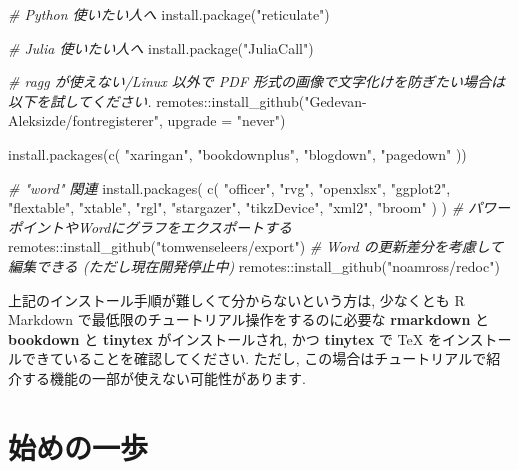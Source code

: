 \documentclass[
]{ltjsarticle}
\newenvironment{Shaded}{\begin{snugshade}}{\end{snugshade}}
\newcommand{\AttributeTok}[1]{\textcolor[rgb]{0.77,0.63,0.00}{#1}}
\newcommand{\CommentTok}[1]{\textcolor[rgb]{0.56,0.35,0.01}{\textit{#1}}}
\newcommand{\FunctionTok}[1]{\textcolor[rgb]{0.00,0.00,0.00}{#1}}
\newcommand{\NormalTok}[1]{#1}
\newcommand{\SpecialCharTok}[1]{\textcolor[rgb]{0.00,0.00,0.00}{#1}}
\newcommand{\StringTok}[1]{\textcolor[rgb]{0.31,0.60,0.02}{#1}}
\newenvironment{infobox}[1]{\begin{itemize}\renewcommand{\labelitemi}{\raisebox{-.7\height}[0pt][0pt]{%
  {\setkeys{Gin}{width=3em,keepaspectratio}\texttt{[image: \_latex/\_img/\#1]}}}}
  \setlength{\fboxsep}{1em}
  \begin{greyblock}
  \item
  }{\end{greyblock}\end{itemize}
}
\begin{document}
\begin{Shaded}
\begin{Highlighting}[numbers=left,,]
\CommentTok{\# Python 使いたい人へ}
\FunctionTok{install.package}\NormalTok{(}\StringTok{"reticulate"}\NormalTok{)}

\CommentTok{\# Julia 使いたい人へ}
\FunctionTok{install.package}\NormalTok{(}\StringTok{"JuliaCall"}\NormalTok{)}

\CommentTok{\# ragg が使えない/Linux 以外で PDF 形式の画像で文字化けを防ぎたい場合は以下を試してください.}
\NormalTok{remotes}\SpecialCharTok{::}\FunctionTok{install\_github}\NormalTok{(}\StringTok{"Gedevan{-}Aleksizde/fontregisterer"}\NormalTok{, }\AttributeTok{upgrade =} \StringTok{"never"}\NormalTok{)}

\FunctionTok{install.packages}\NormalTok{(}\FunctionTok{c}\NormalTok{(}
  \StringTok{"xaringan"}\NormalTok{,}
  \StringTok{"bookdownplus"}\NormalTok{,}
  \StringTok{"blogdown"}\NormalTok{,}
  \StringTok{"pagedown"}
\NormalTok{))}

\CommentTok{\# "word" 関連}
\FunctionTok{install.packages}\NormalTok{(}
  \FunctionTok{c}\NormalTok{(}
    \StringTok{"officer"}\NormalTok{, }\StringTok{"rvg"}\NormalTok{, }\StringTok{"openxlsx"}\NormalTok{,}
    \StringTok{"ggplot2"}\NormalTok{, }\StringTok{"flextable"}\NormalTok{, }\StringTok{"xtable"}\NormalTok{, }\StringTok{"rgl"}\NormalTok{, }\StringTok{"stargazer"}\NormalTok{,}
    \StringTok{"tikzDevice"}\NormalTok{, }\StringTok{"xml2"}\NormalTok{, }\StringTok{"broom"}
\NormalTok{  )}
\NormalTok{)}
\CommentTok{\# パワーポイントやWordにグラフをエクスポートする}
\NormalTok{remotes}\SpecialCharTok{::}\FunctionTok{install\_github}\NormalTok{(}\StringTok{"tomwenseleers/export"}\NormalTok{)}
\CommentTok{\# Word の更新差分を考慮して編集できる (ただし現在開発停止中)}
\NormalTok{remotes}\SpecialCharTok{::}\FunctionTok{install\_github}\NormalTok{(}\StringTok{"noamross/redoc"}\NormalTok{)}
\end{Highlighting}
\end{Shaded}

\begin{infobox}{important}
上記のインストール手順が難しくて分からないという方は, 少なくとも R Markdown で最低限のチュートリアル操作をするのに必要な \textbf{rmarkdown} と \textbf{bookdown} と \textbf{tinytex} がインストールされ, かつ \textbf{tinytex} で TeX をインストールできていることを確認してください. ただし, この場合はチュートリアルで紹介する機能の一部が使えない可能性があります.

\end{infobox}

\hypertarget{first-step}{%
\section{始めの一歩}\label{first-step}}
\end{document}
